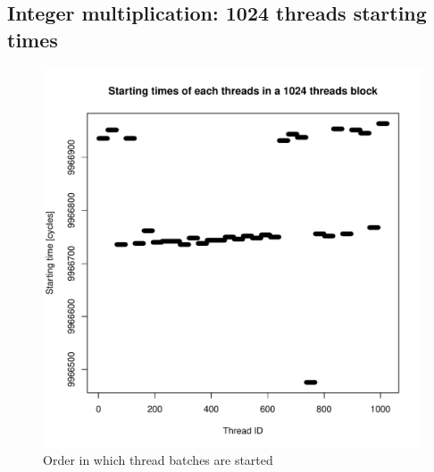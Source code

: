 \documentclass{article}
\def \scalingfactor{.8}
\begin{document}
	\subsection{Integer multiplication: 1024 threads starting times}
    \begin{figure}[h]
    		\centering
		\vspace{-20pt}
	    	\includegraphics[width=\scalingfactor\linewidth]{"graphics/starting_times_ratio31"}
	    	\vspace{-15pt}
	    	\caption{Order in which thread batches are started}
    \end{figure}
    \pagebreak
\end{document}
